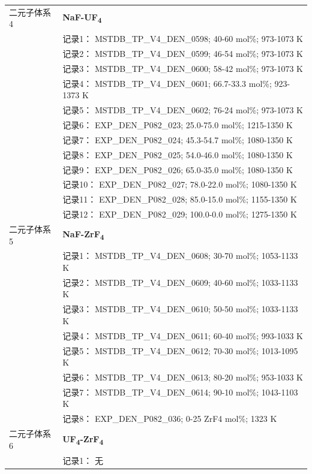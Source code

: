 \documentclass[12pt]{article}
\begin{document}
{\begin{longtable}[]{@{}
  >{\raggedright\arraybackslash}p{}
  >{\raggedright\arraybackslash}p{}@{}}
二元子体系 4  & \textbf{NaF-UF\textsubscript{4}} \\
 & 记录1： MSTDB\_TP\_V4\_DEN\_0598; 40-60 mol\%; 973-1073 K \\
 & 记录2： MSTDB\_TP\_V4\_DEN\_0599; 46-54 mol\%; 973-1073 K \\
 & 记录3： MSTDB\_TP\_V4\_DEN\_0600; 58-42 mol\%; 973-1073 K \\
 & 记录4： MSTDB\_TP\_V4\_DEN\_0601; 66.7-33.3 mol\%; 923-1373 K \\
 & 记录5： MSTDB\_TP\_V4\_DEN\_0602; 76-24 mol\%; 973-1073 K \\
 & 记录6： EXP\_DEN\_P082\_023; 25.0-75.0 mol\%; 1215-1350 K \\
 & 记录7： EXP\_DEN\_P082\_024; 45.3-54.7 mol\%; 1080-1350 K \\
 & 记录8： EXP\_DEN\_P082\_025; 54.0-46.0 mol\%; 1080-1350 K \\
 & 记录9： EXP\_DEN\_P082\_026; 65.0-35.0 mol\%; 1080-1350 K \\
 & 记录10： EXP\_DEN\_P082\_027; 78.0-22.0 mol\%; 1080-1350 K \\
 & 记录11： EXP\_DEN\_P082\_028; 85.0-15.0 mol\%; 1155-1350 K \\
 & 记录12： EXP\_DEN\_P082\_029; 100.0-0.0 mol\%; 1275-1350 K  \\

二元子体系 5  & \textbf{NaF-ZrF\textsubscript{4}} \\
 & 记录1： MSTDB\_TP\_V4\_DEN\_0608; 30-70 mol\%; 1053-1133 K \\
 & 记录2： MSTDB\_TP\_V4\_DEN\_0609; 40-60 mol\%; 1033-1133 K \\
 & 记录3： MSTDB\_TP\_V4\_DEN\_0610; 50-50 mol\%; 1033-1133 K \\
 & 记录4： MSTDB\_TP\_V4\_DEN\_0611; 60-40 mol\%; 993-1033 K \\
 & 记录5： MSTDB\_TP\_V4\_DEN\_0612; 70-30 mol\%; 1013-1095 K \\
 & 记录6： MSTDB\_TP\_V4\_DEN\_0613; 80-20 mol\%; 953-1033 K \\
 & 记录7： MSTDB\_TP\_V4\_DEN\_0614; 90-10 mol\%; 1043-1103 K \\
 & 记录8： EXP\_DEN\_P082\_036; 0-25 ZrF4 mol\%; 1323 K  \\

二元子体系 6 & \textbf{UF\textsubscript{4}-ZrF\textsubscript{4}} \\
 & 记录1： 无 \\
\end{longtable}
}
\end{document}
